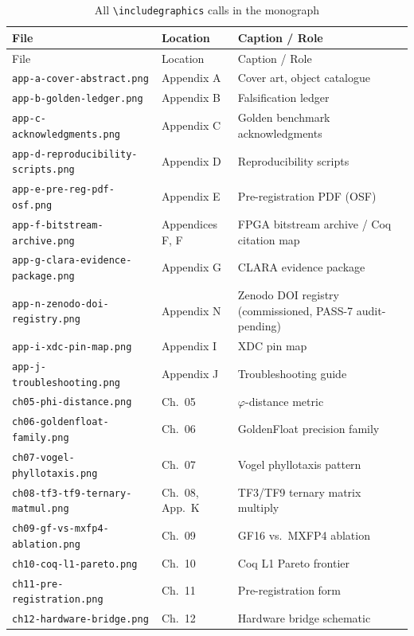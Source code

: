 \begin{longtable}{lll}
\toprule
File & Location & Caption / Role \\
\midrule
\endfirsthead
\toprule
File & Location & Caption / Role \\
\midrule
\endhead
\bottomrule
\endfoot
\bottomrule
\caption{All \texttt{\textbackslash includegraphics} calls in the monograph}
\endlastfoot
\texttt{app-a-cover-abstract.png} &
  Appendix A & Cover art, object catalogue \\
\texttt{app-b-golden-ledger.png} &
  Appendix B & Falsification ledger \\
\texttt{app-c-acknowledgments.png} &
  Appendix C & Golden benchmark acknowledgments \\
\texttt{app-d-reproducibility-scripts.png} &
  Appendix D & Reproducibility scripts \\
\texttt{app-e-pre-reg-pdf-osf.png} &
  Appendix E & Pre-registration PDF (OSF) \\
\texttt{app-f-bitstream-archive.png} &
  Appendices F, F\textquotesingle{} &
  FPGA bitstream archive / Coq citation map \\
\texttt{app-g-clara-evidence-package.png} &
  Appendix G & CLARA evidence package \\
\texttt{app-n-zenodo-doi-registry.png} &
  Appendix N & Zenodo DOI registry (commissioned, PASS-7 audit-pending) \\
\texttt{app-i-xdc-pin-map.png} &
  Appendix I & XDC pin map \\
\texttt{app-j-troubleshooting.png} &
  Appendix J & Troubleshooting guide \\
\texttt{ch05-phi-distance.png} &
  Ch.\ 05 & $\varphi$-distance metric \\
\texttt{ch06-goldenfloat-family.png} &
  Ch.\ 06 & GoldenFloat precision family \\
\texttt{ch07-vogel-phyllotaxis.png} &
  Ch.\ 07 & Vogel phyllotaxis pattern \\
\texttt{ch08-tf3-tf9-ternary-matmul.png} &
  Ch.\ 08, App.\ K & TF3/TF9 ternary matrix multiply \\
\texttt{ch09-gf-vs-mxfp4-ablation.png} &
  Ch.\ 09 & GF16 vs.\ MXFP4 ablation \\
\texttt{ch10-coq-l1-pareto.png} &
  Ch.\ 10 & Coq L1 Pareto frontier \\
\texttt{ch11-pre-registration.png} &
  Ch.\ 11 & Pre-registration form \\
\texttt{ch12-hardware-bridge.png} &
  Ch.\ 12 & Hardware bridge schematic \\

\end{longtable}
